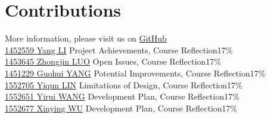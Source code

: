 \documentclass[12pt]{scrreprt}
\begin{document}
\chapter{Contributions}
More information, please visit us on \href{https://github.com/zjzsliyang/OnionExpress}{GitHub}
\vspace{3mm}\\
\href{https://github.com/zjzsliyang}{{\color{blue}1452559 Yang LI}} \hspace{17mm} Project Achievements, Course Reflection\hfill 17\%\\
\href{https://github.com/tjluozhongjin}{{\color{blue}1453645 Zhongjin LUO}} \hspace{5mm} Open Issues, Course Reflection\hfill 17\%\\
\href{https://github.com/Yghifi}{{\color{blue}1451229 Guohui YANG}} \hspace{4.5mm} Potential Improvements, Course Reflection\hfill 17\%\\
\href{https://github.com/lyqun}{{\color{blue}1552705 Yiqun LIN}} \hspace{12mm} Limitations of Design, Course Reflection\hfill 17\%\\
\href{https://github.com/Charon0622}{{\color{blue}1552651 Yirui WANG}} \hspace{7.5mm} Development Plan, Course Reflection\hfill 17\%\\
\href{https://github.com/CandiceGemini}{{\color{blue}1552677 Xinying WU}} \hspace{8.5mm} Development Plan, Course Reflection\hfill 17\%
\end{document}

